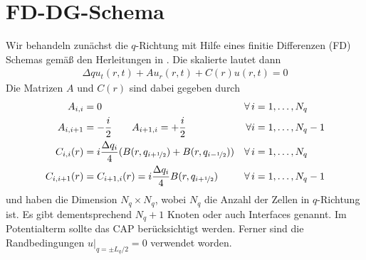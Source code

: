 \section{FD-DG-Schema}
\label{sec:FD-DG-Schema}
Wir behandeln zunächst die $q$-Richtung mit Hilfe eines finitie Differenzen (FD) Schemas gemäß den Herleitungen in \cite{lukas1}. Die skalierte \lvn lautet dann
\begin{align}
  \Delta q u_t(r,t) + A u_r(r,t) + C(r)u(r,t) = 0
  \label{eq:FDschema}
\end{align}
Die Matrizen $A$ und $C(r)$ sind dabei gegeben durch
\begin{align*}
  A_{i,i} &= 0  &\forall \, i&=1,\dots,N_q \\
  A_{i,i+1} &= -\frac{i}{2}   \qquad  A_{i+1, i} = +\frac{i}{2} &\forall i&=1,\dots,N_q-1 \\
  C_{i,i}(r) &= i\frac{\Delta q_i}{4} (B(r, q_{i+\nicefrac{1}{2}}) + B(r, q_{i-\nicefrac{1}{2}}))  &\forall \, i&=1,\dots,N_q \\
  C_{i,i+1}(r) &= C_{i+1,i}(r) = i\frac{\Delta q_i}{4} B(r, q_{i+\nicefrac{1}{2}})  &\forall \, i&=1,\dots,N_q-1
\end{align*}
und haben die Dimension $N_q \times N_q$, wobei $N_q$ die Anzahl der Zellen in $q$-Richtung ist. Es gibt dementsprechend $N_q+1$ Knoten oder auch Interfaces genannt. Im Potentialterm sollte das CAP berücksichtigt werden. Ferner sind die Randbedingungen $u|_{q=\pm L_q/2} = 0$ verwendet worden.

